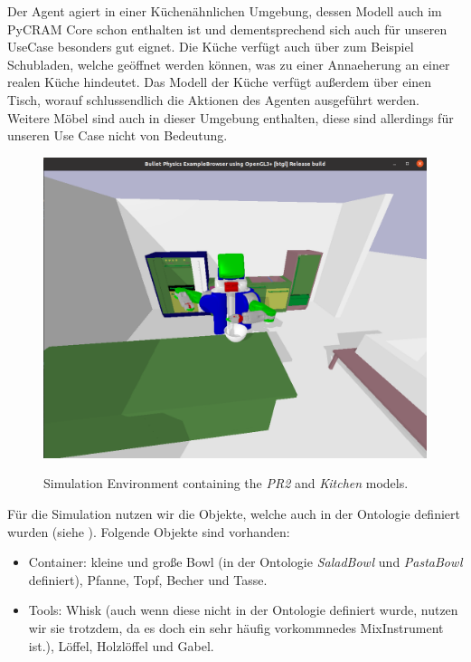 Der Agent agiert in einer Küchenähnlichen Umgebung, dessen Modell auch im PyCRAM Core schon enthalten ist und dementsprechend sich auch für unseren UseCase besonders gut eignet. Die Küche verfügt auch über zum Beispiel Schubladen, welche geöffnet werden können, was zu einer Annaeherung an einer realen Küche hindeutet.
Das Modell der Küche verfügt außerdem über einen Tisch, worauf schlussendlich die Aktionen des Agenten ausgeführt werden.
Weitere Möbel sind auch in dieser Umgebung enthalten, diese sind allerdings für unseren Use Case nicht von Bedeutung.

\begin{figure}[H]
    \includegraphics[scale=0.35]{Graphics/bulletworldexample.png}
    \label{fig:bulletworldexample}
    \caption{Simulation Environment containing the \textit{PR2} and \textit{Kitchen} models. }
\end{figure}

Für die Simulation nutzen wir die Objekte, welche auch in der Ontologie definiert wurden (siehe ).
Folgende Objekte sind vorhanden:
\begin{itemize}
	\item Container: kleine und große Bowl (in der Ontologie \textit{SaladBowl} und \textit{PastaBowl} definiert), Pfanne, Topf, Becher und Tasse.
	\item Tools: Whisk (auch wenn diese nicht in der Ontologie definiert wurde, nutzen wir sie trotzdem, da es doch ein sehr häufig vorkommnedes MixInstrument ist.), Löffel, Holzlöffel und Gabel. 
\end{itemize}

